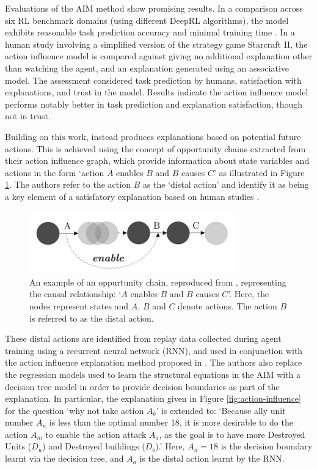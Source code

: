 \documentclass{article}
\begin{document}
\noindent Evaluations of the AIM method show promising results. In a comparison across six RL benchmark domains (using different DeepRL algorithms), the model exhibits reasonable task prediction accuracy and minimal training time \cite{puiutta2020explainable}. In a human study involving a simplified version of the strategy game Starcraft II, the action influence model is compared against giving no additional explanation other than watching the agent, and an explanation generated using an associative model. The assessment considered task prediction by humans, satisfaction with explanations, and trust in the model. Results indicate the action influence model performs notably better in task prediction and explanation satisfaction, though not in trust.

Building on this work, \cite{madumal2020distal} instead produces explanations based on potential future actions. This is achieved using the concept of opportunity chains extracted from their action influence graph, which provide information about state variables and actions in the form ‘action $A$ enables $B$ and $B$ causes $C$’ as illustrated in Figure \ref{fig:oppurtunity chain}. The authors refer to the action $B$ as the `distal action' and identify it as being a key element of a satisfatory explanation based on human studies \cite{madumal2020distal}. 

\begin{figure}[htp]
    \centering
    \includegraphics[width=0.8\textwidth]{Images/oppurtunity chain.png}
    \caption{An example of an oppurtunity chain, reproduced from \cite{madumal2020distal}, representing the causal relationship: ‘$A$ enables $B$ and $B$ causes $C$’. Here, the nodes represent states and $A$, $B$ and $C$ denote actions. The action $B$ is referred to as the distal action.}
    \label{fig:oppurtunity chain}
\end{figure}

\noindent These distal actions are identified from replay data collected during agent training using a recurrent neural network (RNN), and used in conjunction with the action influence explanation method proposed in \cite{madumal2020explainable}. The authors also replace the regression models used to learn the structural equations in the AIM with a decision tree model in order to provide decision boundaries as part of the explanation. In particular, the explanation given in Figure \ref{fig:action-influence} for the question `why not take action $A_b$' is extended to: `Because ally unit number $A_n$ is less than the optimal number 18, it is more desirable to do the action $A_m$ to enable the action attack $A_a$, as the goal is to have more Destroyed Units ($D_u$) and Destroyed buildings ($D_b$).' Here, $A_n = 18$ is the decision boundary learnt via the decision tree, and $A_a$ is the distal action learnt by the RNN.
\end{document}

